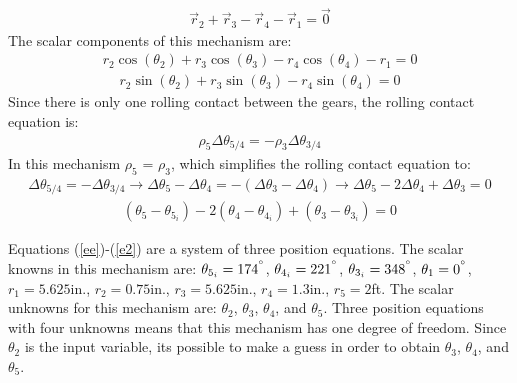 \documentclass[12pt]{article}
\begin{document}
\begin{eqnarray*}
	\vec{r}_{2} + \vec{r}_{3} - \vec{r}_{4} - \vec{r}_{1} = \vec{0}
\end{eqnarray*}
The scalar components of this mechanism are:
\begin{eqnarray}
	{r}_{2}\cos(\theta_{2}) + {r}_{3}\cos(\theta_{3}) - {r}_{4}\cos(\theta_{4}) - {r}_{1} = 0 \label{ee}
\end{eqnarray}
\begin{eqnarray}
	{r}_{2}\sin(\theta_{2}) + {r}_{3}\sin(\theta_{3}) - {r}_{4}\sin(\theta_{4}) = 0 \label{e1}
\end{eqnarray}
Since there is only one rolling contact between the gears, the rolling contact equation is:
\begin{eqnarray*}
	\rho_{5}\Delta\theta_{5/4} = -\rho_{3}\Delta\theta_{3/4}
\end{eqnarray*}
In this mechanism $\rho_{5}$ = $\rho_{3}$, which simplifies the rolling contact equation to:
\begin{eqnarray*}
	\Delta\theta_{5/4} = -\Delta\theta_{3/4} \rightarrow \Delta\theta_{5}-\Delta\theta_{4} = -(\Delta\theta_{3} - \Delta\theta_{4}) \rightarrow \Delta\theta_{5} - 2\Delta\theta_{4} + \Delta\theta_{3} = 0
\end{eqnarray*}
\begin{eqnarray}
	(\theta_{5}-\theta_{5_i}) - 2(\theta_{4}-\theta_{4_i}) + (\theta_{3}-\theta_{3_i}) = 0 \label{e2}
\end{eqnarray}
\begin{doublespace}
 Equations (\ref{ee})-(\ref{e2}) are a system of three position equations. The scalar knowns in this mechanism are: $\theta_{5_i} = 174^{\degree}$, $\theta_{4_i} = 221^{\degree}$, $\theta_{3_i} = 348^{\degree}$, $\theta_{1} = 0^{\degree}$, ${r}_{1} = 5.625$in., ${r}_{2} = 0.75$in., ${r}_{3} = 5.625$in., ${r}_{4} = 1.3$in., ${r}_{5} = 2$ft. The scalar unknowns for this mechanism are: $\theta_{2}$, $\theta_{3}$, $\theta_{4}$, and $\theta_{5}$. Three position equations with four unknowns means that this mechanism has one degree of freedom. Since $\theta_{2}$ is the input variable, its possible to make a guess in order to obtain $\theta_{3}$, $\theta_{4}$, and $\theta_{5}$.
 \end{doublespace}
\end{document}
